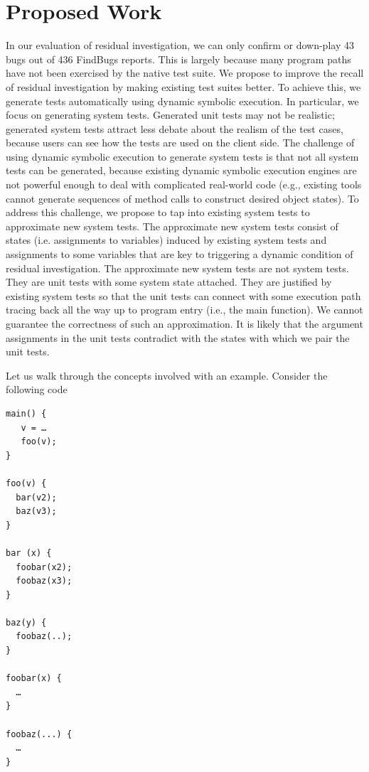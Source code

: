 \documentclass[proposal]{umthesis} %
\begin{document}
  
\chapter{Proposed Work}
\label{chp:proposed}

In our evaluation of residual investigation, we can only confirm or down-play 43 bugs out of 436 FindBugs reports. This is largely because many program paths have not been exercised by the native test suite. We propose to improve the recall of residual investigation by making existing test suites better. To achieve this, we generate tests automatically using dynamic symbolic execution.  In particular, we focus on generating system tests. Generated unit tests may not be realistic; generated system tests attract less debate about the realism of the test cases, because users can see how the tests are used on the client side.  The challenge of using dynamic symbolic execution to generate system tests is that not all system tests can be generated, because existing dynamic symbolic execution engines are not powerful enough to deal with complicated real-world code (e.g., existing tools cannot generate sequences of method calls to construct desired object states)\cite{Xiao:2011:PIP:1985793.1985876}.  To address this challenge, we propose to tap into existing system tests to approximate new system tests. The approximate new system tests consist of  states (i.e. assignments to variables) induced by existing system tests and assignments to some variables that are key to triggering a dynamic condition of residual investigation.  The approximate new system tests are not system tests.  They are unit tests with some system state attached.  They are justified by existing system tests so that the unit tests can connect with some execution path tracing back all the way up to program entry (i.e., the main function).  We cannot guarantee the correctness of such an approximation. It is likely that the argument assignments in the unit tests contradict with the states with which we pair the unit tests.  

Let us walk through the concepts involved with an example. Consider the following code
\begin{small}
\begin{verbatim}
main() {
   v = …
   foo(v);
}

foo(v) {
  bar(v2);
  baz(v3);
}

bar (x) {
  foobar(x2);
  foobaz(x3);
}

baz(y) {
  foobaz(..);
}

foobar(x) {
  …
}

foobaz(...) {
  …
}
\end{verbatim}
\end{small}
\end{document}

